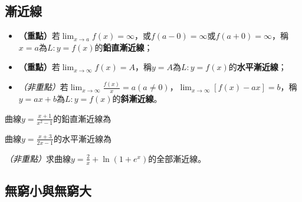 \documentclass[12pt, addpoints]{exam}
\def \important{\textbf{（重點）}}
\def \unimportant{\textit{（非重點）}}
\begin{document}
\newpage %

\subsection{漸近線}

\begin{questions}

\question
\begin{itemize}
    \item \important 若$\displaystyle \lim_{x \to a}f(x)=\infty$，或$f(a-0)=\infty$或$f(a+0)=\infty$，稱$x=a$為$L: y=f(x)$的\textbf{鉛直漸近線}；
    \item \important 若$\displaystyle \lim_{x \to \infty}f(x)=A$，稱$y=A$為$L: y=f(x)$的\textbf{水平漸近線}；
    \item \unimportant 若$\displaystyle \lim_{x \to \infty}\frac{f(x)}{x}=a(a \neq 0)$，$\displaystyle \lim_{x \to \infty} \left[ f(x)-ax \right]=b$，稱$y=ax+b$為$L: y=f(x)$的\textbf{斜漸近線}。
\end{itemize}

\question[1]
曲線$\displaystyle y=\frac{x+1}{x^2-1}$的鉛直漸近線為

\question[1]
曲線$\displaystyle y=\frac{x+3}{2x-1}$的水平漸近線為

\bonusquestion
\unimportant 求曲線$\displaystyle y=\frac{2}{x}+\ln{(1+e^x)}$的全部漸近線。

\end{questions}

\newpage %

\subsection{無窮小與無窮大}
\end{document}

